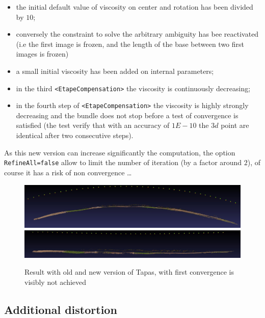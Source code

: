 \begin{itemize}
    \item  the initial default value of viscosity  on center and rotation has been divided by $10$;
    \item  conversely the constraint to solve the arbitrary ambiguity has bee reactivated (i.e the first image is
           frozen, and the length of the base between two first images is frozen)
    \item  a small initial viscosity has been added on internal parameters;
    \item  in the third {\tt <EtapeCompensation>} the viscosity is continuously decreasing;
    \item  in the fourth step of  {\tt <EtapeCompensation>} the viscosity is highly strongly decreasing and
           the bundle does not stop before a test of convergence is satisfied (the test verify that with an
           accuracy of $1E-10$ the $3d$ point are identical after two consecutive steps).
\end{itemize}

As this new version can increase significantly the computation, the option {\tt RefineAll=false}
allow to limit the number of iteration (by a factor around $2$), of course it has a risk of non convergence \dots


\begin{figure}
\begin{center}
   \includegraphics[width=120mm]{FIGS/NewTapas/Old00.jpg}
   \includegraphics[width=120mm]{FIGS/NewTapas/New00.jpg}
\end{center}
\caption{Result with old and new version of Tapas, with first convergence is visibly not achieved}
\label{ImOldNewTapas}
\end{figure}



\subsection{Additional distortion}

